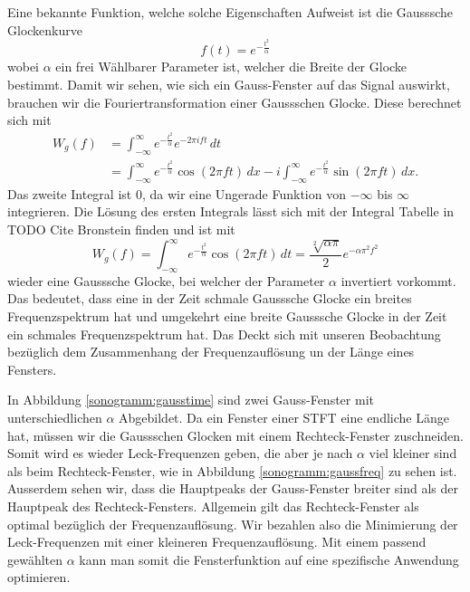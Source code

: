 Eine bekannte Funktion, welche solche Eigenschaften Aufweist ist die Gausssche Glockenkurve
\begin{equation}
    f(t) = e^{-\frac{t^2}{\alpha}}
\end{equation}
wobei $\alpha$ ein frei Wählbarer Parameter ist, welcher die Breite der Glocke 
bestimmt.
Damit wir sehen, wie sich ein Gauss-Fenster auf das Signal auswirkt, brauchen wir
die Fouriertransformation einer Gaussschen Glocke.
Diese berechnet sich mit 
\begin{align}
    W_g(f) &= \int_{-\infty}^{\infty} e^{-\frac{t^2}{\alpha}} e^{- 2 \pi i f t}\, dt\\
    &= \int_{-\infty}^{\infty} e^{-\frac{t^2}{\alpha}} \cos(2 \pi f t)\, dx -
    i \int_{-\infty}^{\infty} e^{-\frac{t^2}{\alpha}} \sin(2 \pi f t)\, dx .
\end{align}
Das zweite Integral ist 0, da wir eine Ungerade Funktion von $-\infty$ bis $\infty$ integrieren.
Die Lösung des ersten Integrals lässt sich mit der Integral Tabelle in TODO Cite Bronstein finden und ist mit
\begin{equation}
    W_g(f) = \int_{-\infty}^{\infty} e^{-\frac{t^2}{\alpha}} \cos(2 \pi f t)\, dt =
    \frac{\sqrt[2]{\alpha \pi}}{2} e^{-\alpha \pi^2 f^2}
\end{equation}
wieder eine Gausssche Glocke, bei welcher der Parameter $\alpha$ invertiert vorkommt.
Das bedeutet, dass eine in der Zeit schmale Gausssche Glocke ein breites Frequenzspektrum hat und umgekehrt eine
breite Gausssche Glocke in der Zeit ein schmales Frequenzspektrum hat.
Das Deckt sich mit unseren Beobachtung bezüglich dem Zusammenhang der 
Frequenzauflösung un der Länge eines Fensters.

In Abbildung \ref{sonogramm:gausstime} sind zwei Gauss-Fenster mit unterschiedlichen 
$\alpha$ Abgebildet.
Da ein Fenster einer STFT eine endliche Länge hat, müssen wir die Gaussschen Glocken 
mit einem Rechteck-Fenster zuschneiden. 
Somit wird es wieder Leck-Frequenzen geben, die aber je nach $\alpha$ viel kleiner sind
als beim Rechteck-Fenster, wie in Abbildung \ref{sonogramm:gaussfreq} zu sehen ist.
Ausserdem sehen wir, dass die Hauptpeaks der Gauss-Fenster breiter sind als der 
Hauptpeak des Rechteck-Fensters.
Allgemein gilt das Rechteck-Fenster als optimal bezüglich der Frequenzauflösung.
Wir bezahlen also die Minimierung der Leck-Frequenzen mit einer kleineren Frequenzauflösung. 
Mit einem passend gewählten $\alpha$ kann man somit die Fensterfunktion auf eine spezifische
Anwendung optimieren.

